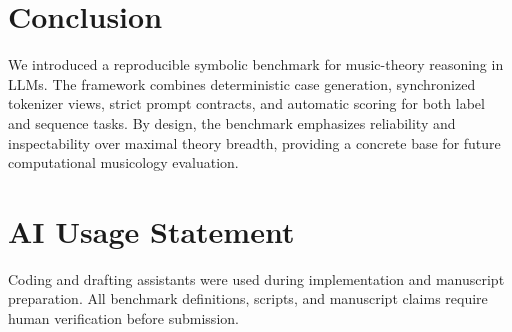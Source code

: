 \documentclass{article}
\begin{document}
\section{Conclusion}
\label{sec:conclusion}

We introduced a reproducible symbolic benchmark for music-theory reasoning in LLMs. The framework combines deterministic case generation, synchronized tokenizer views, strict prompt contracts, and automatic scoring for both label and sequence tasks. By design, the benchmark emphasizes reliability and inspectability over maximal theory breadth, providing a concrete base for future computational musicology evaluation.

\section{AI Usage Statement}
\label{sec:ai}

Coding and drafting assistants were used during implementation and manuscript preparation. All benchmark definitions, scripts, and manuscript claims require human verification before submission.

\clearpage


\end{document}
